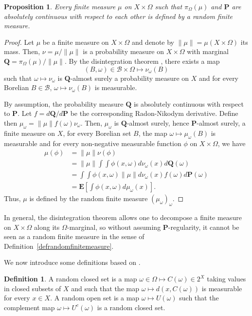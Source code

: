 \documentclass{amsart}
\newtheorem{prop}[thm]{Proposition}
\theoremstyle{definition}
\newtheorem{defn}[thm]{Definition}
\theoremstyle{remark}
\begin{document}
\begin{prop}\label{disintegrationrandom}
Every finite measure $\mu$ on $X\times \Omega$ such that $\pi_\Omega(\mu)$ and $\mathbf P$ are absolutely continuous with respect to each other is defined by a random finite measure.
\end{prop}

\begin{proof}
Let $\mu$ be a finite measure on $X\times \Omega$ and denote by $\|\mu\|=\mu(X\times \Omega)$ its mass.
Then, $\nu=\mu/\|\mu\|$ is a probability measure on $X\times \Omega$ with marginal $\mathbf Q=\pi_\Omega(\mu)/\|\mu\|$.
By the disintegration theorem \cite[Proposition~3.6]{Crauel}, there exists a map
$$(B,\omega)\in \mathcal{B}\times \Omega\mapsto \nu_\omega(B)$$
such that
$\omega\mapsto \nu_\omega$ is $\mathbf Q$-almost surely a probability measure on $X$ and for every Borelian $B\in \mathcal{B}$, $\omega \mapsto \nu_\omega(B)$ is measurable.

By assumption, the probability measure $\mathbf Q$ is absolutely continuous with respect to $\mathbf P$.
Let $f=d\mathbf Q/d\mathbf P$ be the corresponding Radon-Nikodym derivative.
Define then $\mu_\omega=\|\mu\|f(\omega)\nu_\omega$.
Then, $\mu_\omega$ is $\mathbf Q$-almost surely, hence $\mathbf P$-almost surely, a finite measure on $X$, for every Borelian set $B$, the map $\omega\mapsto \mu_\omega(B)$ is measurable and for every non-negative measurable function $\phi$ on $X\times \Omega$, we have
\begin{align*}
\mu(\phi)&=\|\mu\|\nu(\phi)\\&=\|\mu\|\int \int \phi(x,\omega) d\nu_\omega(x) d\mathbf Q(\omega)\\&=\int \int \phi(x,\omega)\|\mu\|d\nu_\omega(x) f(\omega)d\mathbf P(\omega)\\
&=\mathbf E \left [\int \phi(x,\omega)d\mu_\omega(x)\right ].
\end{align*}
Thus, $\mu$ is defined by the random finite measure $(\mu_\omega)_\omega$.
\end{proof}

In general, the disintegration theorem allows one to decompose a finite measure on $X\times \Omega$ along its $\Omega$-marginal, so without assuming $\mathbf P$-regularity, it cannot be seen as a random finite measure in the sense of Definition~\ref{defrandomfinitemeasure}.

We now introduce some definitions based on \cite{Crauel}.

\begin{defn}\label{defrandomclosedset}
A random closed set is a map $\omega \in \Omega \mapsto C(\omega)\in 2^X$ taking values in closed subsets of $X$ and such that the map $\omega\mapsto d(x,C(\omega))$ is measurable for every $x\in X$.
A random open set is a map $\omega \mapsto U(\omega)$ such that the complement map $\omega\mapsto U^c(\omega)$ is a random closed set.
\end{defn}
\end{document}
